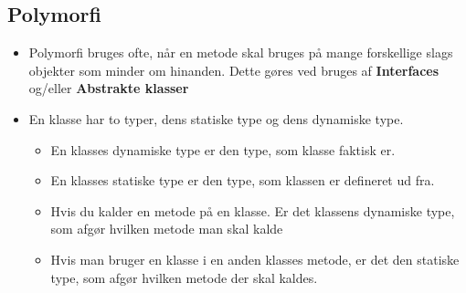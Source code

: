 \documentclass{article}
\begin{document}
\subsection{Polymorfi}
\begin{itemize}
	\item Polymorfi bruges ofte, når en metode skal bruges på mange forskellige slags objekter som minder om hinanden. Dette gøres ved bruges af \textbf{Interfaces} og/eller \textbf{Abstrakte klasser} 
	\item En klasse har to typer, dens statiske type og dens dynamiske type.
	\begin{itemize}
		\item En klasses dynamiske type er den type, som klasse faktisk er.
		\item En klasses statiske type er den type, som klassen er defineret ud fra.
		\item Hvis du kalder en metode på en klasse. Er det klassens dynamiske type, som afgør hvilken metode man skal kalde
		\item Hvis man bruger en klasse i en anden klasses metode, er det den statiske type, som afgør hvilken metode der skal kaldes.  
	\end{itemize}
\end{itemize}
\end{document}
